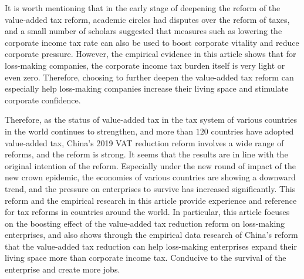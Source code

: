 \documentclass[3p,times]{elsarticle}
\begin{document}
It is worth mentioning that in the early stage of deepening the reform of the value-added tax reform, academic circles had disputes over the reform of taxes, and a small number of scholars suggested that measures such as lowering the corporate income tax rate can also be used to boost corporate vitality and reduce corporate pressure. However, the empirical evidence in this article shows that for loss-making companies, the corporate income tax burden itself is very light or even zero. Therefore, choosing to further deepen the value-added tax reform can especially help loss-making companies increase their living space and stimulate corporate confidence.

Therefore, as the status of value-added tax in the tax system of various countries in the world continues to strengthen, and more than $120$ countries have adopted value-added tax, China's 2019 VAT reduction reform involves a wide range of reforms, and the reform is strong. It seems that the results are in line with the original intention of the reform. Especially under the new round of impact of the new crown epidemic, the economies of various countries are showing a downward trend, and the pressure on enterprises to survive has increased significantly. This reform and the empirical research in this article provide experience and reference for tax reforms in countries around the world. In particular, this article focuses on the boosting effect of the value-added tax reduction reform on loss-making enterprises, and also shows through the empirical data research of China's reform that the value-added tax reduction can help loss-making enterprises expand their living space more than corporate income tax. Conducive to the survival of the enterprise and create more jobs.




\end{document}
